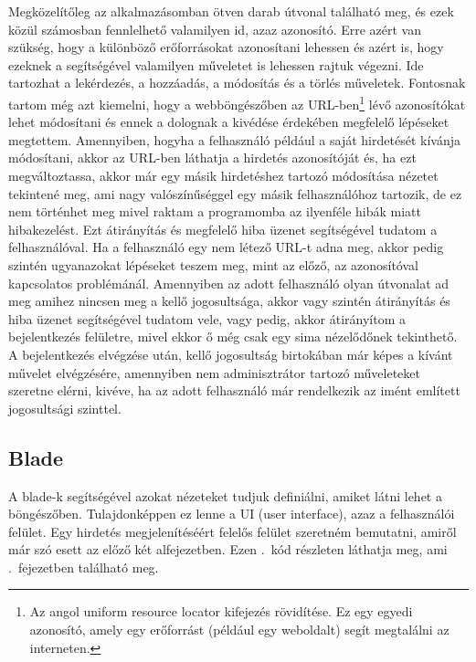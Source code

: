 \documentclass[]{thesis-ekf}
\theoremstyle{definition}
\theoremstyle{remark}
\begin{document}
		Megközelítőleg az alkalmazásomban ötven darab útvonal található meg, és ezek közül számosban fennlelhető valamilyen id, azaz azonosító. Erre azért van szükség, hogy a különböző erőforrásokat azonosítani lehessen és azért is, hogy ezeknek a segítségével valamilyen műveletet is lehessen rajtuk végezni. Ide tartozhat a lekérdezés, a hozzáadás, a módosítás és a törlés műveletek. Fontosnak tartom még azt kiemelni, hogy a webböngészőben az URL-ben\footnote{Az angol uniform resource locator kifejezés rövidítése. Ez egy egyedi azonosító, amely egy erőforrást (például egy weboldalt) segít megtalálni az interneten.} lévő azonosítókat lehet módosítani és ennek a dolognak a kivédése érdekében megfelelő lépéseket megtettem. Amennyiben, hogyha a felhasználó például a saját hirdetését kívánja módosítani, akkor az URL-ben láthatja a hirdetés azonosítóját és, ha ezt megváltoztassa, akkor már egy másik hirdetéshez tartozó módosítása nézetet tekintené meg, ami nagy valószínűséggel egy másik felhasználóhoz tartozik, de ez nem történhet meg mivel raktam a programomba az ilyenféle hibák miatt hibakezelést. Ezt átirányítás és megfelelő hiba üzenet segítségével tudatom a felhasználóval. Ha a felhasználó egy nem létező URL-t adna meg, akkor pedig szintén ugyanazokat lépéseket teszem meg, mint az előző, az azonosítóval kapcsolatos problémánál. Amennyiben az adott felhasználó olyan útvonalat ad meg amihez nincsen meg a kellő jogosultsága, akkor vagy szintén átirányítás és hiba üzenet segítségével tudatom vele, vagy pedig, akkor átirányítom a bejelentkezés felületre, mivel ekkor ő még csak egy sima nézelődőnek tekinthető. A bejelentkezés elvégzése után, kellő jogosultság birtokában már képes a kívánt művelet elvégzésére, amennyiben nem adminisztrátor tartozó műveleteket szeretne elérni, kivéve, ha az adott felhasználó már rendelkezik az imént említett jogosultsági szinttel.
	
	\subsection{Blade}\label{sc-blade}
		A blade-k segítségével azokat nézeteket tudjuk definiálni, amiket látni lehet a böngészőben. Tulajdonképpen ez lenne a UI (user interface), azaz a felhasználói felület. Egy hirdetés megjelenítéséért felelős felület szeretném bemutatni, amiről már szó esett az előző két alfejezetben. Ezen .~kód részleten láthatja meg, ami .~fejezetben található meg.
	
\end{document}

